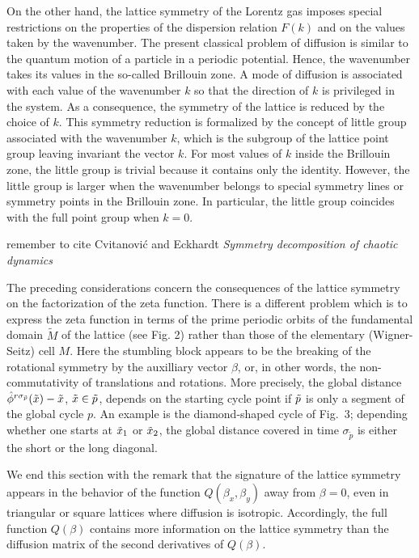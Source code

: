 On the other hand, the lattice symmetry of the Lorentz gas
imposes special restrictions on the properties of the dispersion relation
$F(k)$ and on the values taken by the wavenumber.  The present classical
problem of diffusion is similar to the quantum motion of a particle in a
periodic potential.  Hence, the wavenumber takes its values in the so-called
Brillouin zone.  A mode of diffusion is associated with each value of
the wavenumber $k$ so that the direction of $k$ is privileged in the
system.  As a consequence, the symmetry of the lattice is reduced by the choice
of $k$.  This symmetry reduction is formalized by the concept of little group
associated with the wavenumber $k$, which is the subgroup of the lattice point
group leaving invariant the vector $k$.  For most values of $k$ inside the
Brillouin zone, the little group is trivial because it contains only the
identity.  However, the little group is larger when the wavenumber belongs to
special symmetry lines or symmetry points in the Brillouin zone.  In particular,
the little group coincides with the full point group when $k=0$.

remember to cite Cvitanovi\'c and Eckhardt {\em Symmetry
decomposition of chaotic dynamics}

The preceding considerations concern the consequences of the lattice symmetry
on the factorization of the zeta function.  There is a different problem which
is to express the zeta function in terms of the prime periodic orbits of the
fundamental domain $\tilde M$ of the lattice (see Fig. 2) rather than
those of the elementary (Wigner-Seitz) cell $M$.
Here the stumbling block appears to be
the breaking of the rotational symmetry by
the auxilliary vector $\beta$, or, in other words,
the non-commutativity of translations and rotations.
More precisely, the global distance
$ \hat\phi^{r \sigma_{\tilde{p}}} (\tilde x{}) - \tilde x{} $, $\tilde x{} \in {\tilde p}$,
depends on the starting cycle point if
${\tilde p}$ is only a segment of the global cycle $p$. An
example is the diamond-shaped cycle of Fig.~3;
depending whether one starts at $\tilde x_1$ or $\tilde x_2$, the global
distance covered in time $\sigma_{\tilde{p}}$ is either the short or the
long diagonal.

We end this section with the remark that the signature of
the lattice symmetry appears in the behavior of the function $Q(\beta_x,
\beta_y)$ away from $\beta=0$, even in
triangular or square lattices where diffusion is isotropic.  Accordingly, the
full function $Q(\beta)$ contains more information on the lattice symmetry than
the diffusion matrix of the second derivatives of $Q(\beta)$.

